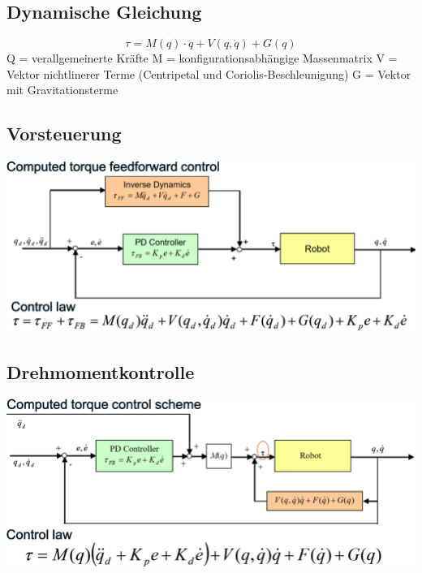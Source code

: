 \begin{minipage}{0.5\linewidth}
     \vspace{-1cm}
\subsection{Dynamische Gleichung}
    \vspace{-1cm}
    \[   \tau = M(q)\cdot \ddot{q}+ V(q,\dot{q})+G(q) \]
    Q = verallgemeinerte Kräfte\newline
    M = konfigurationsabhängige Massenmatrix\newline
    V = Vektor nichtlinerer Terme\newline
    \quad (Centripetal und Coriolis-Beschleunigung)\newline
    G = Vektor mit Gravitationsterme
\end{minipage}
\begin{minipage}{0.5\linewidth}
    \vspace{-0.8cm}
    \subsection{Vorsteuerung}
    \vspace{-0.2cm}
    \includegraphics[width=\linewidth]{./bilder/Vorsteuerung}
\end{minipage}
\begin{minipage}{0.5\linewidth}
    \subsection{Drehmomentkontrolle}
    \includegraphics[width=\linewidth]{./bilder/RegMod2}
\end{minipage}
